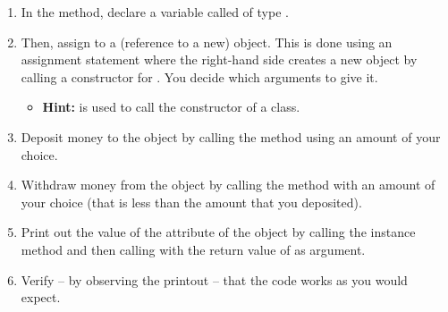 \begin{enumerate}
\begin{itemize}
    \end{itemize}
  \item In the  method, declare a variable called  of type .
  \item Then, assign to  a (reference to a new)  object. This is done using an assignment statement where the right-hand side creates a new  object by calling a constructor for . You decide which arguments to give it.
    \begin{itemize}
      \item \textbf{Hint:}  is used to call the constructor of a class.
    \end{itemize}
  \item Deposit money to the  object by calling the  method using an amount of your choice.
  \item Withdraw money from the  object by calling the  method with an amount of your choice (that is less than the amount that you deposited).
  \item Print out the value of the  attribute of the  object by calling the  instance method and then calling  with the return value of  as argument.
  \item Verify -- by observing the printout -- that the code works as you would expect.
\end{enumerate}

